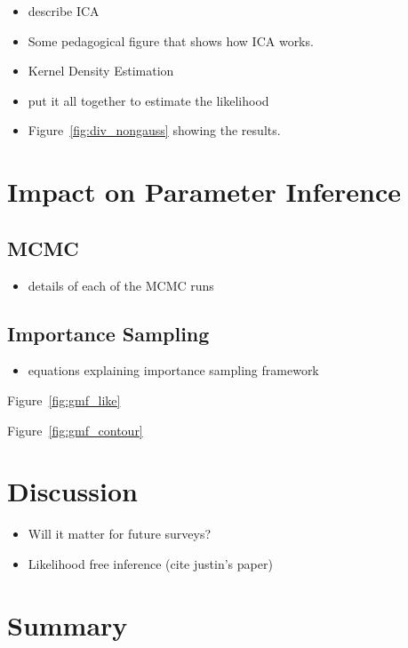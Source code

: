 \documentclass[12pt, letterpaper, preprint]{aastex}
\newcommand{\bitem}{\begin{itemize}}
\newcommand{\eitem}{\end{itemize}}
\begin{document}

\bitem
    \item describe ICA 
    \item Some pedagogical figure that shows how ICA works. 
    \item Kernel Density Estimation 
    \item put it all together to estimate the likelihood
    \item Figure~\ref{fig:div_nongauss} showing the results.
\eitem

\section{Impact on Parameter Inference}
\subsection{MCMC}
\bitem
    \item details of each of the MCMC runs
\eitem

\subsection{Importance Sampling} 
\bitem
    \item equations explaining importance sampling framework
\eitem
Figure~\ref{fig:gmf_like}


Figure~\ref{fig:gmf_contour}

\section{Discussion}
\bitem
    \item Will it matter for future surveys? 
    \item Likelihood free inference (cite justin's paper) 
\eitem

\section{Summary}
\end{document}
